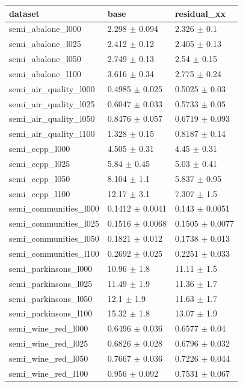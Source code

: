 \begin{tabular}{lll}
\toprule
dataset & base & residual\_xx \\
\midrule
semi\_abalone\_l000 & 2.298 $\pm$ 0.094 & 2.326 $\pm$ 0.1 \\
semi\_abalone\_l025 & 2.412 $\pm$ 0.12 & 2.405 $\pm$ 0.13 \\
semi\_abalone\_l050 & 2.749 $\pm$ 0.13 & 2.54 $\pm$ 0.15 \\
semi\_abalone\_l100 & 3.616 $\pm$ 0.34 & 2.775 $\pm$ 0.24 \\
semi\_air\_quality\_l000 & 0.4985 $\pm$ 0.025 & 0.5025 $\pm$ 0.03 \\
semi\_air\_quality\_l025 & 0.6047 $\pm$ 0.033 & 0.5733 $\pm$ 0.05 \\
semi\_air\_quality\_l050 & 0.8476 $\pm$ 0.057 & 0.6719 $\pm$ 0.093 \\
semi\_air\_quality\_l100 & 1.328 $\pm$ 0.15 & 0.8187 $\pm$ 0.14 \\
semi\_ccpp\_l000 & 4.505 $\pm$ 0.31 & 4.45 $\pm$ 0.31 \\
semi\_ccpp\_l025 & 5.84 $\pm$ 0.45 & 5.03 $\pm$ 0.41 \\
semi\_ccpp\_l050 & 8.104 $\pm$ 1.1 & 5.837 $\pm$ 0.95 \\
semi\_ccpp\_l100 & 12.17 $\pm$ 3.1 & 7.307 $\pm$ 1.5 \\
semi\_communities\_l000 & 0.1412 $\pm$ 0.0041 & 0.143 $\pm$ 0.0051 \\
semi\_communities\_l025 & 0.1516 $\pm$ 0.0068 & 0.1505 $\pm$ 0.0077 \\
semi\_communities\_l050 & 0.1821 $\pm$ 0.012 & 0.1738 $\pm$ 0.013 \\
semi\_communities\_l100 & 0.2692 $\pm$ 0.025 & 0.2251 $\pm$ 0.033 \\
semi\_parkinsons\_l000 & 10.96 $\pm$ 1.8 & 11.11 $\pm$ 1.5 \\
semi\_parkinsons\_l025 & 11.49 $\pm$ 1.9 & 11.36 $\pm$ 1.7 \\
semi\_parkinsons\_l050 & 12.1 $\pm$ 1.9 & 11.63 $\pm$ 1.7 \\
semi\_parkinsons\_l100 & 15.32 $\pm$ 1.8 & 13.07 $\pm$ 1.9 \\
semi\_wine\_red\_l000 & 0.6496 $\pm$ 0.036 & 0.6577 $\pm$ 0.04 \\
semi\_wine\_red\_l025 & 0.6826 $\pm$ 0.028 & 0.6796 $\pm$ 0.032 \\
semi\_wine\_red\_l050 & 0.7667 $\pm$ 0.036 & 0.7226 $\pm$ 0.044 \\
semi\_wine\_red\_l100 & 0.956 $\pm$ 0.092 & 0.7531 $\pm$ 0.067 \\
\bottomrule
\end{tabular}
